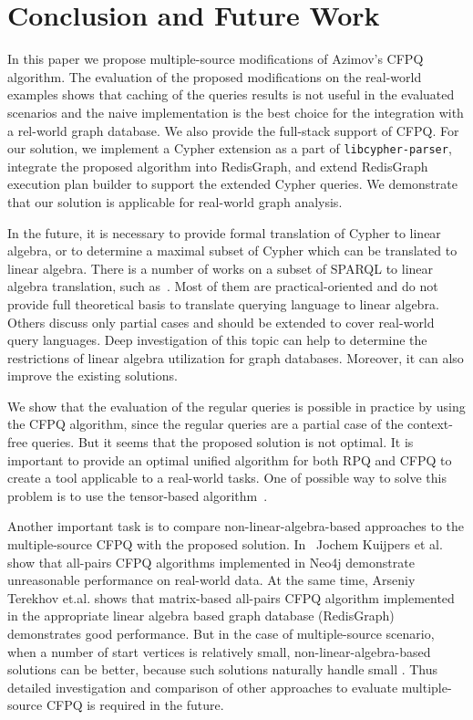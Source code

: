\section{Conclusion and Future Work}
In this paper we propose  multiple-source modifications of Azimov's CFPQ algorithm.
The evaluation of the proposed modifications on the real-world examples shows that caching of the queries results is not useful in the evaluated scenarios and the naive implementation is the best choice for the integration with a rel-world graph database.
We also provide the full-stack support of CFPQ.
For our solution, we implement a Cypher extension as a part of \texttt{libcypher-parser}, integrate the proposed algorithm into RedisGraph, and extend RedisGraph execution plan builder to support the extended Cypher queries.
We demonstrate that our solution is applicable for real-world graph analysis.

In the future, it is necessary to provide formal translation of Cypher to linear algebra, or to determine a maximal subset of Cypher which can be translated to linear algebra.
There is a number of works on a subset of SPARQL to linear algebra translation, such as~\cite{10.14778/3229863.3236239,10.1007/978-3-642-34002-4_36,10.1145/3302424.3303962,DBLP:journals/corr/MetzlerM15a}.
Most of them are practical-oriented and do not provide full theoretical basis to translate querying language to linear algebra.
Others discuss only partial cases and should be extended to cover real-world query languages.
Deep investigation of this topic can help to determine the restrictions of linear algebra utilization for graph databases.
Moreover, it can also improve the existing solutions.

We show that the evaluation of the regular queries is possible in practice by using the CFPQ algorithm, since the regular queries are a partial case of the context-free queries.
But it seems that the proposed solution is not optimal.
It is important to provide an optimal unified algorithm for both RPQ and CFPQ to create a tool applicable to a real-world tasks.
One of possible way to solve this problem is to use the tensor-based algorithm~\cite{10.1007/978-3-030-54832-2_6}.

Another important task is to compare non-linear-algebra-based approaches to the multiple-source CFPQ with the proposed solution.
In~\cite{Kuijpers:2019:ESC:3335783.3335791} Jochem Kuijpers et al. show that all-pairs CFPQ algorithms implemented in Neo4j demonstrate unreasonable performance on real-world data.
At the same time, Arseniy Terekhov et.al. shows that matrix-based all-pairs CFPQ algorithm implemented in the appropriate linear algebra based graph database (RedisGraph) demonstrates good performance.
But in the case of multiple-source scenario, when a number of start vertices is relatively small, non-linear-algebra-based solutions can be better, because such solutions naturally handle small .
Thus detailed investigation and comparison of other approaches to evaluate multiple-source CFPQ is required in the future.